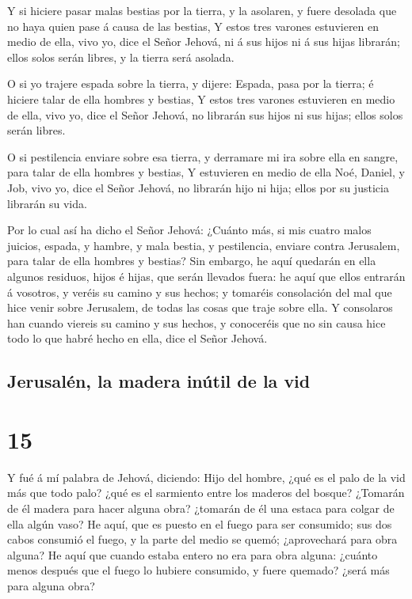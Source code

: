  Y si hiciere pasar malas bestias por la tierra, y la
asolaren, y fuere desolada que no haya quien pase á causa de las
bestias,  Y estos tres varones estuvieren en medio de ella,
vivo yo, dice el Señor Jehová, ni á sus hijos ni á sus hijas librarán;
ellos solos serán libres, y la tierra será asolada.

 O si yo trajere espada sobre la tierra, y dijere: Espada,
pasa por la tierra; é hiciere talar de ella hombres y bestias,
 Y estos tres varones estuvieren en medio de ella, vivo yo,
dice el Señor Jehová, no librarán sus hijos ni sus hijas; ellos solos
serán libres.

 O si pestilencia enviare sobre esa tierra, y derramare mi
ira sobre ella en sangre, para talar de ella hombres y bestias,
 Y estuvieren en medio de ella Noé, Daniel, y Job, vivo yo,
dice el Señor Jehová, no librarán hijo ni hija; ellos por su justicia
librarán su vida.

 Por lo cual así ha dicho el Señor Jehová: ¿Cuánto más, si
mis cuatro malos juicios, espada, y hambre, y mala bestia, y
pestilencia, enviare contra Jerusalem, para talar de ella hombres y
bestias?  Sin embargo, he aquí quedarán en ella algunos
residuos, hijos é hijas, que serán llevados fuera: he aquí que ellos
entrarán á vosotros, y veréis su camino y sus hechos; y tomaréis
consolación del mal que hice venir sobre Jerusalem, de todas las cosas
que traje sobre ella.  Y consolaros han cuando viereis su
camino y sus hechos, y conoceréis que no sin causa hice todo lo que
habré hecho en ella, dice el Señor Jehová.

\hypertarget{jerusaluxe9n-la-madera-inuxfatil-de-la-vid}{%
\subsection{Jerusalén, la madera inútil de la
vid}\label{jerusaluxe9n-la-madera-inuxfatil-de-la-vid}}

\hypertarget{section-14}{%
\section{15}\label{section-14}}

 Y fué á mí palabra de Jehová, diciendo:  Hijo
del hombre, ¿qué es el palo de la vid más que todo palo? ¿qué es el
sarmiento entre los maderos del bosque?  ¿Tomarán de él
madera para hacer alguna obra? ¿tomarán de él una estaca para colgar de
ella algún vaso?  He aquí, que es puesto en el fuego para
ser consumido; sus dos cabos consumió el fuego, y la parte del medio se
quemó; ¿aprovechará para obra alguna?  He aquí que cuando
estaba entero no era para obra alguna: ¿cuánto menos después que el
fuego lo hubiere consumido, y fuere quemado? ¿será más para alguna obra?

